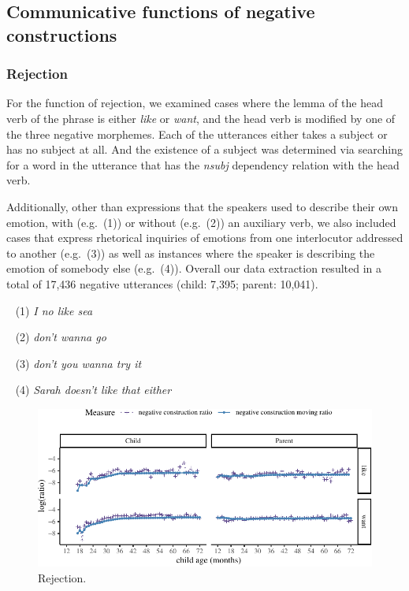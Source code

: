 \documentclass[10pt, letterpaper]{article}
\newenvironment{CodeChunk}{}{}
\begin{document}
\hypertarget{communicative-functions-of-negative-constructions}{%
\subsection{Communicative functions of negative
constructions}\label{communicative-functions-of-negative-constructions}}

\hypertarget{rejection}{%
\subsubsection{Rejection}\label{rejection}}

For the function of rejection, we examined cases where the lemma of the
head verb of the phrase is either \emph{like} or \emph{want}, and the
head verb is modified by one of the three negative morphemes. Each of
the utterances either takes a subject or has no subject at all. And the
existence of a subject was determined via searching for a word in the
utterance that has the \emph{nsubj} dependency relation with the head
verb.

Additionally, other than expressions that the speakers used to describe
their own emotion, with (e.g.~(1)) or without (e.g.~(2)) an auxiliary
verb, we also included cases that express rhetorical inquiries of
emotions from one interlocutor addressed to another (e.g.~(3)) as well
as instances where the speaker is describing the emotion of somebody
else (e.g.~(4)). Overall our data extraction resulted in a total of
17,436 negative utterances (child: 7,395; parent: 10,041).

~ (1) \emph{I no like sea}

~ (2) \emph{don't wanna go}

~ (3) \emph{don't you wanna try it}

~ (4) \emph{Sarah doesn't like that either}

\begin{figure}[h]

\begin{CodeChunk}


\begin{center}\includegraphics{figs/emotion-1} \end{center}

\end{CodeChunk}
\caption[This image spans both columns]{Rejection.}\label{fig:rejection}
\end{figure}
\end{document}
